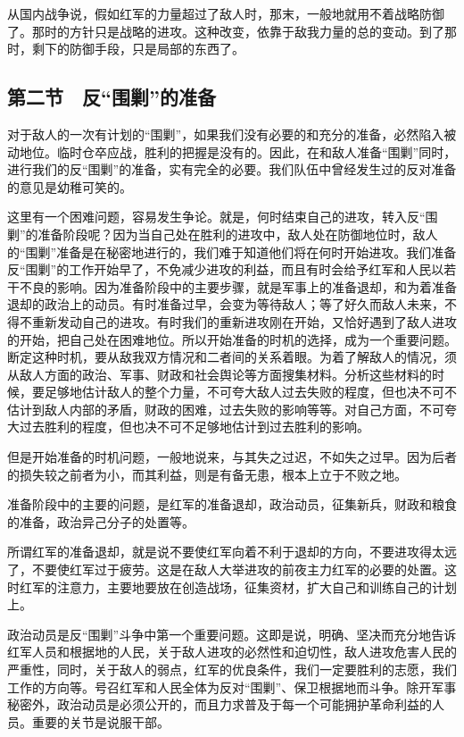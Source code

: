从国内战争说，假如红军的力量超过了敌人时，那末，一般地就用不着战略防御了。那时的方针只是战略的进攻。这种改变，依靠于敌我力量的总的变动。到了那时，剩下的防御手段，只是局部的东西了。

\subsection{第二节　反“围剿”的准备}

对于敌人的一次有计划的“围剿”，如果我们没有必要的和充分的准备，必然陷入被动地位。临时仓卒应战，胜利的把握是没有的。因此，在和敌人准备“围剿”同时，进行我们的反“围剿”的准备，实有完全的必要。我们队伍中曾经发生过的反对准备的意见是幼稚可笑的。

这里有一个困难问题，容易发生争论。就是，何时结束自己的进攻，转入反“围剿”的准备阶段呢？因为当自己处在胜利的进攻中，敌人处在防御地位时，敌人的“围剿”准备是在秘密地进行的，我们难于知道他们将在何时开始进攻。我们准备反“围剿”的工作开始早了，不免减少进攻的利益，而且有时会给予红军和人民以若干不良的影响。因为准备阶段中的主要步骤，就是军事上的准备退却，和为着准备退却的政治上的动员。有时准备过早，会变为等待敌人；等了好久而敌人未来，不得不重新发动自己的进攻。有时我们的重新进攻刚在开始，又恰好遇到了敌人进攻的开始，把自己处在困难地位。所以开始准备的时机的选择，成为一个重要问题。断定这种时机，要从敌我双方情况和二者间的关系着眼。为着了解敌人的情况，须从敌人方面的政治、军事、财政和社会舆论等方面搜集材料。分析这些材料的时候，要足够地估计敌人的整个力量，不可夸大敌人过去失败的程度，但也决不可不估计到敌人内部的矛盾，财政的困难，过去失败的影响等等。对自己方面，不可夸大过去胜利的程度，但也决不可不足够地估计到过去胜利的影响。

但是开始准备的时机问题，一般地说来，与其失之过迟，不如失之过早。因为后者的损失较之前者为小，而其利益，则是有备无患，根本上立于不败之地。

准备阶段中的主要的问题，是红军的准备退却，政治动员，征集新兵，财政和粮食的准备，政治异己分子的处置等。

所谓红军的准备退却，就是说不要使红军向着不利于退却的方向，不要进攻得太远了，不要使红军过于疲劳。这是在敌人大举进攻的前夜主力红军的必要的处置。这时红军的注意力，主要地要放在创造战场，征集资材，扩大自己和训练自己的计划上。

政治动员是反“围剿”斗争中第一个重要问题。这即是说，明确、坚决而充分地告诉红军人员和根据地的人民，关于敌人进攻的必然性和迫切性，敌人进攻危害人民的严重性，同时，关于敌人的弱点，红军的优良条件，我们一定要胜利的志愿，我们工作的方向等。号召红军和人民全体为反对“围剿”、保卫根据地而斗争。除开军事秘密外，政治动员是必须公开的，而且力求普及于每一个可能拥护革命利益的人员。重要的关节是说服干部。

